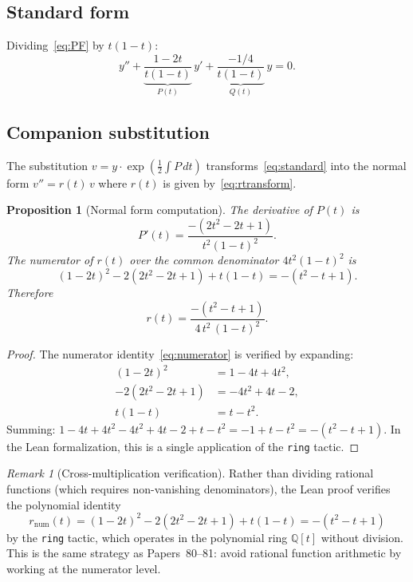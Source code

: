 \documentclass[11pt]{article}
\theoremstyle{plain}
\newtheorem{proposition}[theorem]{Proposition}
\theoremstyle{definition}
\theoremstyle{remark}
\newtheorem{remark}[theorem]{Remark}
\newcommand{\Q}{\mathbb{Q}}
\begin{document}
\subsection{Standard form}

Dividing~\eqref{eq:PF} by $t(1-t)$:
\begin{equation}\label{eq:standard}
  y'' + \underbrace{\frac{1-2t}{t(1-t)}}_{P(t)}\,y' + \underbrace{\frac{-1/4}{t(1-t)}}_{Q(t)}\,y = 0.
\end{equation}

\subsection{Companion substitution}

The substitution $v = y \cdot \exp(\frac{1}{2}\int P\,dt)$ transforms~\eqref{eq:standard} into the normal form $v'' = r(t)\,v$ where $r(t)$ is given by~\eqref{eq:rtransform}.

\begin{proposition}[Normal form computation]\label{prop:normalform}
The derivative of $P(t)$ is
\[
  P'(t) = \frac{-(2t^2 - 2t + 1)}{t^2(1-t)^2}.
\]
The numerator of $r(t)$ over the common denominator $4t^2(1-t)^2$ is
\begin{equation}\label{eq:numerator}
  (1-2t)^2 - 2(2t^2 - 2t + 1) + t(1-t) = -(t^2 - t + 1).
\end{equation}
Therefore
\begin{equation}\label{eq:normalform}
  r(t) = \frac{-(t^2 - t + 1)}{4\,t^2\,(1-t)^2}.
\end{equation}
\end{proposition}

\begin{proof}
The numerator identity~\eqref{eq:numerator} is verified by expanding:
\begin{align*}
  (1-2t)^2 &= 1 - 4t + 4t^2, \\
  -2(2t^2 - 2t + 1) &= -4t^2 + 4t - 2, \\
  t(1-t) &= t - t^2.
\end{align*}
Summing: $1 - 4t + 4t^2 - 4t^2 + 4t - 2 + t - t^2 = -1 + t - t^2 = -(t^2 - t + 1)$.
In the Lean formalization, this is a single application of the \texttt{ring} tactic.
\end{proof}

\begin{remark}[Cross-multiplication verification]\label{rem:crossmult}
Rather than dividing rational functions (which requires non-vanishing denominators), the Lean proof verifies the polynomial identity
\[
  r_{\mathrm{num}}(t) = (1-2t)^2 - 2(2t^2 - 2t + 1) + t(1-t) = -(t^2 - t + 1)
\]
by the \texttt{ring} tactic, which operates in the polynomial ring $\Q[t]$ without division.
This is the same strategy as Papers~80--81: avoid rational function arithmetic by working at the numerator level.
\end{remark}
\end{document}
